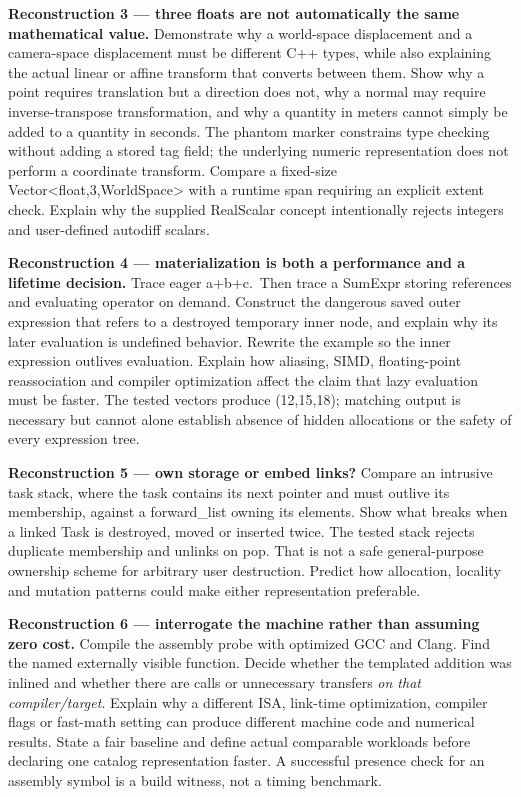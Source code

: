 \textbf{Reconstruction 3 --- three floats are not automatically the same mathematical value.} Demonstrate why a world-space displacement and a camera-space displacement must be different C++ types, while also explaining the actual linear or affine transform that converts between them. Show why a point requires translation but a direction does not, why a normal may require inverse-transpose transformation, and why a quantity in meters cannot simply be added to a quantity in seconds. The phantom marker constrains type checking without adding a stored tag field; the underlying numeric representation does not perform a coordinate transform. Compare a fixed-size Vector\textless float,3,WorldSpace\textgreater{} with a runtime span requiring an explicit extent check. Explain why the supplied RealScalar concept intentionally rejects integers and user-defined autodiff scalars.

\textbf{Reconstruction 4 --- materialization is both a performance and a lifetime decision.} Trace eager a+b+c.~Then trace a SumExpr storing references and evaluating operator on demand. Construct the dangerous saved outer expression that refers to a destroyed temporary inner node, and explain why its later evaluation is undefined behavior. Rewrite the example so the inner expression outlives evaluation. Explain how aliasing, SIMD, floating-point reassociation and compiler optimization affect the claim that lazy evaluation must be faster. The tested vectors produce (12,15,18); matching output is necessary but cannot alone establish absence of hidden allocations or the safety of every expression tree.

\textbf{Reconstruction 5 --- own storage or embed links?} Compare an intrusive task stack, where the task contains its next pointer and must outlive its membership, against a forward\_list owning its elements. Show what breaks when a linked Task is destroyed, moved or inserted twice. The tested stack rejects duplicate membership and unlinks on pop. That is not a safe general-purpose ownership scheme for arbitrary user destruction. Predict how allocation, locality and mutation patterns could make either representation preferable.

\textbf{Reconstruction 6 --- interrogate the machine rather than assuming zero cost.} Compile the assembly probe with optimized GCC and Clang. Find the named externally visible function. Decide whether the templated addition was inlined and whether there are calls or unnecessary transfers \emph{on that compiler/target}. Explain why a different ISA, link-time optimization, compiler flags or fast-math setting can produce different machine code and numerical results. State a fair baseline and define actual comparable workloads before declaring one catalog representation faster. A successful presence check for an assembly symbol is a build witness, not a timing benchmark.

